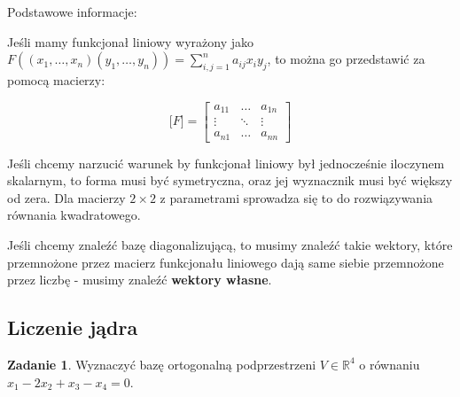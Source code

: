 \documentclass[11pt]{article}
\theoremstyle{definition}
\newtheorem{zadanie}{Zadanie}
\begin{document}


Podstawowe informacje:

Jeśli mamy funkcjonał liniowy wyrażony jako $F((x_1,\dots,x_n)(y_1,\dots,y_n)) = \sum_{i,j=1}^na_{ij}x_iy_j$, to można go przedstawić za pomocą macierzy:

$$\Big[F\Big] = \begin{bmatrix}
    a_{11} & \dots & a_{1n}\\
    \vdots & \ddots & \vdots\\
    a_{n1} & \dots & a_{nn}
    \end{bmatrix}$$

    Jeśli chcemy narzucić warunek by funkcjonał liniowy był jednocześnie iloczynem skalarnym, to forma musi być symetryczna, oraz jej wyznacznik musi być większy od zera. Dla macierzy $2\times2$ z parametrami sprowadza się to do rozwiązywania równania kwadratowego.

    Jeśli chcemy znaleźć bazę diagonalizującą, to musimy znaleźć takie wektory, które przemnożone przez macierz funkcjonału liniowego dają same siebie przemnożone przez liczbę - musimy znaleźć \textbf{wektory własne}.
\subsection{Liczenie jądra}

\begin{zadanie}
Wyznaczyć bazę ortogonalną podprzestrzeni $V\in \mathbb R^4$ o równaniu $x_1-2x_2+x_3-x_4=0$.
\end{zadanie}
\end{document}
